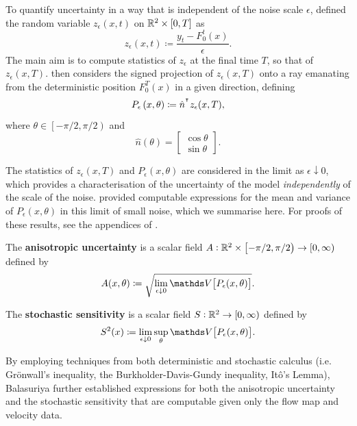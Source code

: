 To quantify uncertainty in a way that is independent of the noise scale \(\epsilon\), \citet{Balasuriya_2020_StochasticSensitivityComputable} defined the random variable \(z_\epsilon\left(x,t\right)\) on \(\mathbb{R}^2 \times [0,T]\) as
\[
	z_\epsilon\left(x,t\right) \coloneqq \frac{y_t - F_0^t(x)}{\epsilon}.
\]
The main aim is to compute statistics of \(z_\epsilon\) at the final time \(T\), so that of \(z_\epsilon\left(x,T\right)\).
\citet{Balasuriya_2020_StochasticSensitivityComputable} then considers the signed projection of \(z_\epsilon\left(x,T\right)\) onto a ray emanating from the deterministic position \(F_0^T(x)\) in a given direction, defining
\[
	P_\epsilon\left(x,\theta\right) \coloneqq \hat{n}^{^{\intercal}} z_\epsilon(x,T),
\]
where \(\theta \in \left[-\pi/2, \pi/2\right)\) and
\[
	\hat{n}(\theta) = \begin{bmatrix}
		\cos{\theta} \\
		\sin{\theta}
	\end{bmatrix}.
\]

The statistics of \(z_\epsilon\left(x,T\right)\) and \(P_\epsilon(x,\theta)\) are considered in the limit as \(\epsilon\downarrow 0\), which provides a characterisation of the uncertainty of the model \emph{independently} of the scale of the noise.
\citet{Balasuriya_2020_StochasticSensitivityComputable} provided computable expressions for the mean and variance of \(P_\epsilon\left(x,\theta\right)\) in this limit of small noise, which we summarise here.
For proofs of these results, see the appendices of \citet{Balasuriya_2020_StochasticSensitivityComputable}.

\begin{definition}
	\begin{alpharate}
		\item The \textbf{anisotropic uncertainty} is a scalar field \(A: \mathbb{R}^2\times\left[-\pi/2, \pi/2\right) \to [0,\infty)\) defined by
		\[
			A(x,\theta) \coloneqq \sqrt{\lim_{\epsilon\downarrow 0}\var{P_\epsilon(x,\theta)}}.
		\]

		\item The \textbf{stochastic sensitivity} is a scalar field \(S: \mathbb{R}^2 \to [0,\infty)\) defined by
		\[
			S^2(x) \coloneqq \lim_{\epsilon\downarrow 0}\sup_{\theta}{\var{P_\epsilon(x,\theta)}}.
		\]
	\end{alpharate}
\end{definition}

By employing techniques from both deterministic and stochastic calculus (i.e. Gr\"onwall's inequality, the Burkholder-Davis-Gundy inequality, It\^o's Lemma), Balasuriya further established expressions for both the anisotropic uncertainty and the stochastic sensitivity that are computable given only the flow map and velocity data.


